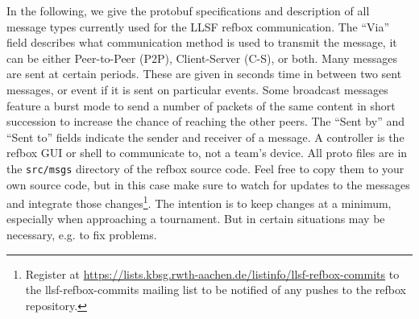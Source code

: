\documentclass[a4paper]{article}
\begin{document}
In the following, we give the protobuf specifications and description
of all message types currently used for the LLSF refbox
communication. The ``Via'' field describes what communication method
is used to transmit the message, it can be either Peer-to-Peer (P2P),
Client-Server (C-S), or both. Many messages are sent at certain
periods. These are given in seconds time in between two sent messages,
or event if it is sent on particular events. Some broadcast messages
feature a burst mode to send a number of packets of the same content
in short succession to increase the chance of reaching the other
peers. The ``Sent by'' and ``Sent to'' fields indicate the sender and
receiver of a message. A controller is the refbox GUI or shell to
communicate to, not a team's device. All proto files are in the
\texttt{src/msgs} directory of the refbox source code. Feel free to
copy them to your own source code, but in this case make sure to watch
for updates to the messages and integrate those
changes\footnote{Register at
  \url{https://lists.kbsg.rwth-aachen.de/listinfo/llsf-refbox-commits}
  to the llsf-refbox-commits mailing list to be notified of any pushes
  to the refbox repository.}. The intention is to keep changes at a
minimum, especially when approaching a tournament. But in certain
situations may be necessary, e.g. to fix problems.

\bigskip

\newcommand{\msgspec}[6]{%
\hspace{-1.1\parindent}
\begin{minipage}{\linewidth}
  \begin{minipage}[t]{.48\linewidth}
    \vspace{0pt}
    
      {../../src/msgs/#1}
  \end{minipage}
  \hspace{.01\linewidth}
  \begin{minipage}[t]{.51\linewidth}
    \vspace{2pt}
    \small
    \begin{tabular}{>{\bfseries}ll>{\bfseries}ll}
      File:&\multicolumn{3}{p{.95\linewidth}}{%
        \texttt{#1}
      }\\[3pt]
      Via:&#2&Period:&#3\\
      Sent by:&#4&Sent to:&#5\\[3pt]
      \multicolumn{4}{p{.95\linewidth}}{%
        #6
      }
    \end{tabular}
  \end{minipage}
\end{minipage}
}
\end{document}
